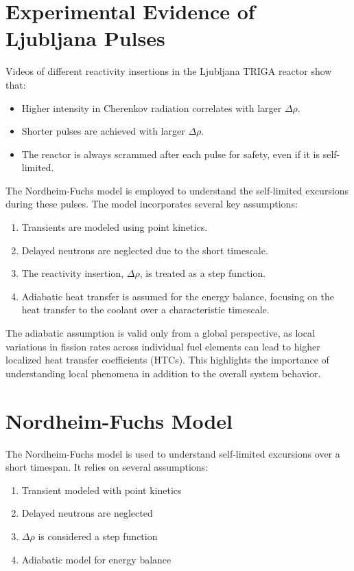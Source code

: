 \section{Experimental Evidence of Ljubljana Pulses}
Videos of different reactivity insertions in the Ljubljana TRIGA reactor show that:
\begin{itemize}
    \item Higher intensity in Cherenkov radiation correlates with larger $\Delta \rho$.
    \item Shorter pulses are achieved with larger $\Delta \rho$.
    \item The reactor is always scrammed after each pulse for safety, even if it is self-limited.
\end{itemize}
The Nordheim-Fuchs model is employed to understand the self-limited excursions during these pulses. The model incorporates several key assumptions:
\begin{enumerate}
    \item Transients are modeled using point kinetics.
    \item Delayed neutrons are neglected due to the short timescale.
    \item The reactivity insertion, $\Delta \rho$, is treated as a step function.
    \item Adiabatic heat transfer is assumed for the energy balance, focusing on the heat transfer to the coolant over a characteristic timescale.
\end{enumerate}
The adiabatic assumption is valid only from a global perspective, as local variations in fission rates across individual fuel elements can lead to higher localized heat transfer coefficients (HTCs). This highlights the importance of understanding local phenomena in addition to the overall system behavior.

\section{Nordheim-Fuchs Model}
The Nordheim-Fuchs model is used to understand self-limited excursions over a short timespan. It relies on several assumptions:
\begin{enumerate}
    \item Transient modeled with point kinetics
    \item Delayed neutrons are neglected
    \item $\Delta \rho$ is considered a step function
    \item Adiabatic model for energy balance
\end{enumerate}

